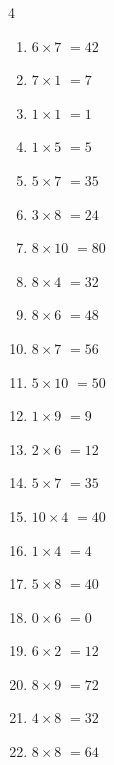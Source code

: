 \begin{multicols}{4}
\begin{enumerate}
  \item $6\times 7$
        $=42$

  \item $7\times 1$
        $=7$

  \item $1\times 1$
        $=1$

  \item $1\times 5$
        $=5$

  \item $5\times 7$
        $=35$

  \item $3\times 8$
        $=24$

  \item $8\times 10$
        $=80$

  \item $8\times 4$
        $=32$

  \item $8\times 6$
        $=48$

  \item $8\times 7$
        $=56$

  \item $5\times 10$
        $=50$

  \item $1\times 9$
        $=9$

  \item $2\times 6$
        $=12$

  \item $5\times 7$
        $=35$

  \item $10\times 4$
        $=40$

  \item $1\times 4$
        $=4$

  \item $5\times 8$
        $=40$

  \item $0\times 6$
        $=0$

  \item $6\times 2$
        $=12$

  \item $8\times 9$
        $=72$

\columnbreak %

\resetques

  \item $4\times 8$
        $=32$

  \item $8\times 8$
        $=64$


\end{enumerate}
\end{multicols}
